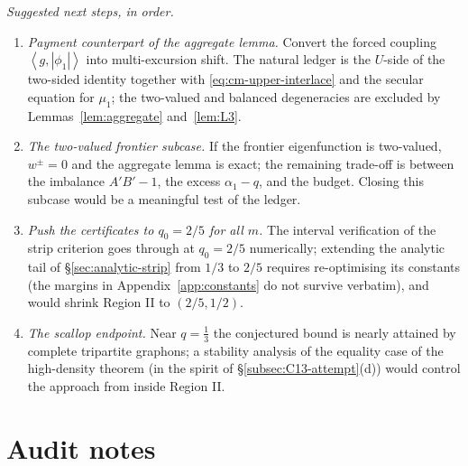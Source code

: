 \documentclass[11pt]{article}
\newcommand{\ip}[2]{\left\langle #1,#2\right\rangle}
\begin{document}
\medskip\noindent\emph{Suggested next steps, in order.}
\begin{enumerate}[label=\textup{(\arabic*)}]
\item \emph{Payment counterpart of the aggregate lemma.}  Convert the forced
coupling $\ip{g}{|\phi_1|}$ into multi-excursion shift.  The natural ledger is
the $U$-side of the two-sided identity together with
\eqref{eq:cm-upper-interlace} and the secular equation for $\mu_1$; the
two-valued and balanced degeneracies are excluded by
Lemmas~\ref{lem:aggregate} and~\ref{lem:L3}.
\item \emph{The two-valued frontier subcase.}  If the frontier eigenfunction
is two-valued, $w^\pm=0$ and the aggregate lemma is exact; the remaining
trade-off is between the imbalance $A'B'-1$, the excess $\alpha_1-q$, and the
budget.  Closing this subcase would be a meaningful test of the ledger.
\item \emph{Push the certificates to $q_0=2/5$ for all $m$.}  The interval
verification of the strip criterion goes through at $q_0=2/5$ numerically;
extending the analytic tail of \S\ref{sec:analytic-strip} from $1/3$ to $2/5$
requires re-optimising its constants (the margins in
Appendix~\ref{app:constants} do not survive verbatim), and would shrink
Region II to $(2/5,1/2)$.
\item \emph{The scallop endpoint.}  Near $q=\tfrac13$ the conjectured bound
is nearly attained by complete tripartite graphons; a stability analysis of
the equality case of the high-density theorem (in the spirit of
\S\ref{subsec:C13-attempt}(d)) would control the approach from inside
Region II.
\end{enumerate}

\section{Audit notes}\label{sec:audit}
\end{document}
